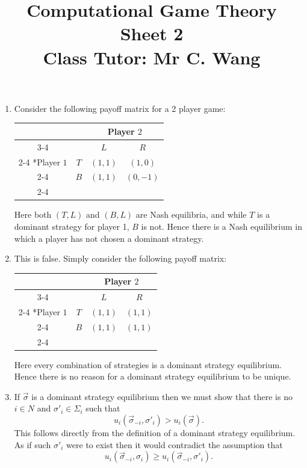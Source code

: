 \documentclass[a4paper]{article}
\title{Computational Game Theory \\ Sheet 2 \\
Class Tutor: Mr C. Wang}
\begin{document}
\maketitle

\begin{exercise}{1}
  \begin{enumerate}[label=(\alph*)]
    \item Consider the following payoff matrix for a 2 player game:
      \begin{table}[H]
        \setlength{\extrarowheight}{2pt}
        \centering
        \begin{tabular}{*{4}{c|}}
          \multicolumn{2}{c}{} & \multicolumn{2}{c}{Player $2$}\\\cline{3-4}
          \multicolumn{1}{c}{} &  & $L$  & $R$ \\\cline{2-4}
          \multirow{2}*{Player $1$}  & $T$ & $(1, 1)$ & $(1, 0)$ \\\cline{2-4}
                                     & $B$ & $(1, 1)$ & $(0, -1)$ \\\cline{2-4}
        \end{tabular}
      \end{table}
      Here both $ (T,L) $ and $ (B, L) $ are Nash equilibria, and while $ T $ is a dominant strategy for player 1, $ B $ is not. Hence there is a Nash equilibrium in which a player has not chosen a dominant strategy.

    \item This is false. Simply consider the following payoff matrix:
      \begin{table}[H]
        \setlength{\extrarowheight}{2pt}
        \centering
        \begin{tabular}{*{4}{c|}}
          \multicolumn{2}{c}{} & \multicolumn{2}{c}{Player $2$}\\\cline{3-4}
          \multicolumn{1}{c}{} &  & $L$  & $R$ \\\cline{2-4}
          \multirow{2}*{Player $1$}  & $T$ & $(1, 1)$ & $(1, 1)$ \\\cline{2-4}
                                     & $B$ & $(1, 1)$ & $(1, 1)$ \\\cline{2-4}
        \end{tabular}
      \end{table}
      Here every combination of strategies is a dominant strategy equilibrium. Hence there is no reason for a dominant strategy equilibrium to be unique.

    \item If $ \vec{\sigma} $ is a dominant strategy equilibrium then we must show that there is no $ i \in N $ and $ \sigma'_i \in \Sigma_i $ such that
      \begin{equation*}
        u_i(\vec{\sigma}_{-i}, \sigma'_i) > u_i(\vec{\sigma})
      .\end{equation*}
      This follows directly from the definition of a dominant strategy equilibrium. As if such $ \sigma'_i $ were to exist then it would contradict the assumption that
      \begin{equation*}
        u_i(\vec{\sigma}_{-i}, \sigma_i) \geq u_i(\vec{\sigma}_{-i}, \sigma'_i).
      \end{equation*}


\end{enumerate}
\end{exercise}
\end{document}
